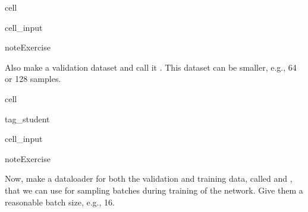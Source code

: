 \documentclass[letterpaper,10pt,english]{jupyterBook}
\begin{document}
\begin{sphinxuseclass}{cell}
\begin{sphinxVerbatimInput}
\begin{sphinxuseclass}{cell_input}
\begin{sphinxVerbatim}[commandchars=\\\{\}]
  \PYG{p}{[}
    \PYG{p}{[} \PYG{p}{]}
\PYG{p}{]}    

       
\end{sphinxVerbatim}

\end{sphinxuseclass}\end{sphinxVerbatimInput}

\end{sphinxuseclass}
\begin{sphinxadmonition}{note}{Exercise}

\sphinxAtStartPar
Also make a validation dataset and call it . This dataset can be smaller, e.g., 64 or 128 samples.
\end{sphinxadmonition}

\begin{sphinxuseclass}{cell}
\begin{sphinxuseclass}{tag_student}\begin{sphinxVerbatimInput}

\begin{sphinxuseclass}{cell_input}
\begin{sphinxVerbatim}[commandchars=\\\{\}]
\end{sphinxVerbatim}

\end{sphinxuseclass}\end{sphinxVerbatimInput}

\end{sphinxuseclass}
\end{sphinxuseclass}
\begin{sphinxadmonition}{note}{Exercise}

\sphinxAtStartPar
Now, make a dataloader for both the validation and training data, called  and , that we can use for sampling batches during training of the network. Give them a reasonable batch size, e.g., 16.
\end{sphinxadmonition}
\end{document}
